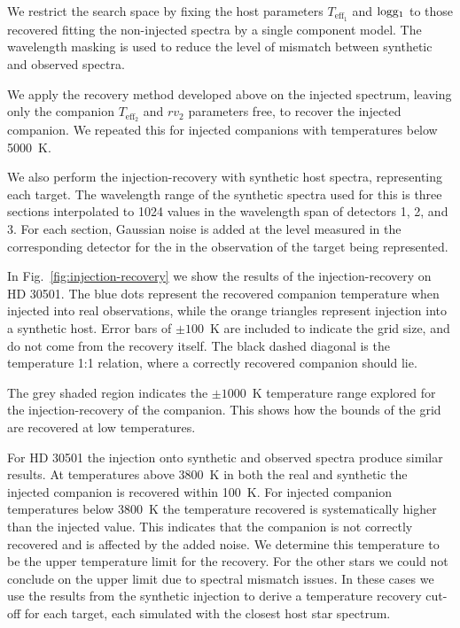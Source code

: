 \documentclass[fleqn,usenatbib]{mnras}
\begin{document}
    We restrict the search space by fixing the host parameters \(T_{\textrm{eff}_1}\) and \(\rm logg_1\) to those recovered fitting the non-injected spectra by a single component model. The wavelength masking is used to reduce the level of mismatch between synthetic and observed spectra.
    
    We apply the recovery method developed above on the injected spectrum, leaving only the companion \(T_{\textrm{eff}_2}\) and \({rv}_2\) parameters free, to recover the injected companion. We repeated this for injected companions with temperatures below 5000~K.
    
    We also perform the injection-recovery with synthetic host spectra, representing each target. The wavelength range of the synthetic spectra used for this is three sections interpolated to 1024 values in the wavelength span of detectors 1, 2, and 3. For each section, Gaussian noise is added at the level measured in the corresponding detector for the in the observation of the target being represented.
    
    In Fig.~\ref{fig:injection-recovery} we show the results of the injection-recovery on {HD 30501}. The blue dots represent the recovered companion temperature when injected into real observations, while the orange triangles represent injection into a synthetic host. Error bars of \(\pm100\)~K are included to indicate the grid size, and do not come from the recovery itself. The black dashed diagonal is the temperature 1:1 relation, where a correctly recovered companion should lie.
    
    The grey shaded region indicates the \(\pm1000\)~K temperature range explored for the injection-recovery of the companion. This shows how the bounds of the grid are recovered at low temperatures.
    
    For {HD 30501} the injection onto synthetic and observed spectra produce similar results. At temperatures above 3800~K in both the real and synthetic the injected companion is recovered within 100~K. For injected companion temperatures below 3800~K the temperature recovered is systematically higher than the injected value. This indicates that the companion is not correctly recovered and is affected by the added noise. We determine this temperature to be the upper temperature limit for the recovery. For the other stars we could not conclude on the upper limit due to spectral mismatch issues. In these cases we use the results from the synthetic injection to derive a temperature recovery cut-off for each target, each simulated with the closest host star spectrum.
    
\end{document}
